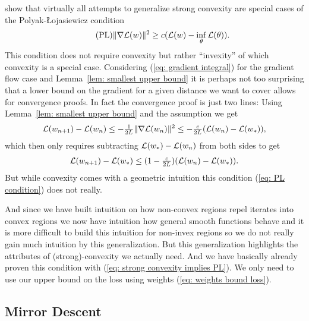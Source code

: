 \textcite{karimiLinearConvergenceGradient2020} show that virtually all
attempts to generalize strong convexity are special cases of the
Polyak-\L{}ojasiewicz condition
\begin{align}
	\label{eq: PL condition}\tag{PL}
	\|\nabla \mathcal{L}(w) \|^2 \ge c(\mathcal{L}(w)-\inf_{\theta}\mathcal{L}(\theta)).
\end{align}
This condition does not require convexity but rather ``invexity'' of which
convexity is a special case. Considering (\ref{eq: gradient integral}) for
the gradient flow case and Lemma~\ref{lem: smallest upper bound} it is
perhaps not too surprising that a lower bound on the gradient for a given
distance we want to cover allows for convergence proofs. In fact the
convergence proof is just two lines:
Using Lemma~\ref{lem: smallest upper bound} and the assumption we get
\begin{align*}
	\mathcal{L}(w_{n+1})- \mathcal{L}(w_n) \le -\tfrac1{2L} \|\nabla\mathcal{L}(w_n)\|^2
	\le -\tfrac{c}{2L}(\mathcal{L}(w_n) - \mathcal{L}(w_*)),
\end{align*}
which then only requires subtracting \(\mathcal{L}(w_*)-\mathcal{L}(w_n)\) from
both sides to get
\begin{align*}
	\mathcal{L}(w_{n+1}) - \mathcal{L}(w_*)
	\le (1-\tfrac{c}{2L})(\mathcal{L}(w_n) - \mathcal{L}(w_*)).
\end{align*}
But while convexity
comes with a geometric intuition this condition (\ref{eq: PL condition})
does not really.

And since we have built intuition on how non-convex regions
repel iterates into convex regions we now have intuition how general smooth
functions behave and it is more difficult to build this intuition for non-invex
regions so we do not really gain much intuition by this generalization. But
this generalization highlights the attributes of (strong)-convexity we
actually need. And we have basically already proven this condition with
(\ref{eq: strong convexity implies PL}). We only need to use our upper bound on the loss
using weights (\ref{eq: weights bound loss}).

\subsection{Mirror Descent}\label{subsec: mirror descent}

